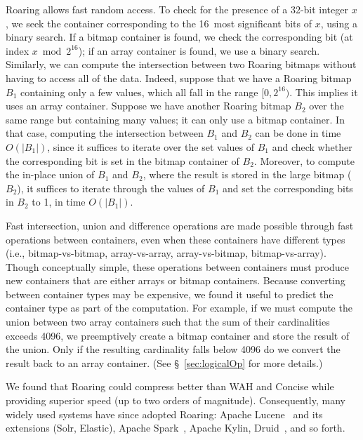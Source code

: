 \documentclass[times]{speauth}
\begin{document}
Roaring allows fast random access. To check for the presence of a 32-bit integer $x$, we seek
the container corresponding to the 16~most significant bits of $x$, using a binary search. If a bitmap container is found, we check the corresponding bit (at index $x \bmod{2^{16}}$); if an array container is found, we use a binary search.
Similarly, we can compute the intersection between two Roaring bitmaps without having to access all of the data. Indeed, suppose that we have a Roaring bitmap $B_1$ containing
only a few values, which all fall
in the range $[0,2^{16})$.  This implies it uses an array container.
Suppose we have another Roaring bitmap $B_2$ over the same range but containing many values; it
can only use
a bitmap container. In that case, computing the intersection between $B_1$ and $B_2$ can be done in time $O(|B_1|)$, since it suffices to iterate over the set values of $B_1$ and check whether the corresponding bit is set in the bitmap container of $B_2$. Moreover, to compute the in-place union of $B_1$ and $B_2$, where the result is stored in the large bitmap ($B_2$), it suffices to iterate through the values of $B_1$ and set the corresponding bits in $B_2$ to 1, in time $O(|B_1|)$.

Fast intersection, union and difference operations are made possible through fast operations between containers, even when these containers have different types (i.e., bitmap-vs-bitmap, array-vs-array, array-vs-bitmap, bitmap-vs-array). Though conceptually simple, these operations between containers must produce new containers that are either arrays or bitmap containers. Because converting between container types may be expensive, we found it useful to predict
the container type as part of the computation. For example, if we must compute the union between two array containers such that the sum of their cardinalities exceeds \num{4096}, we preemptively create a bitmap container and store the result of the union. Only if the resulting cardinality falls below \num{4096} do we convert the result back to an array container. (See \S~\ref{sec:logicalOp} for more details.)

We found that Roaring could compress better than WAH and Concise while providing superior speed (up to two orders of magnitude). Consequently, many widely used systems have since adopted Roaring: Apache Lucene~\cite{RoaringDocIdSet,RoaringDocIdSetBlogPost} and its extensions (Solr, Elastic), Apache Spark~\cite{Zaharia:2010:SCC:1863103.1863113},
 Apache Kylin, Druid~\cite{Yang:2014:DRA:2588555.2595631}, and so forth.
\end{document}
